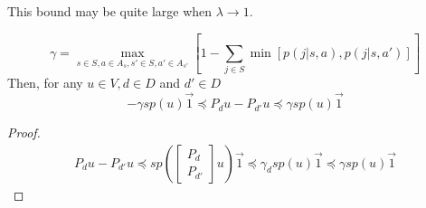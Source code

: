 This bound may be quite large when $ \lambda \rightarrow 1 $.

\begin{lemma}
    \[
        \gamma = \max_{s \in S, a \in A_s, s' \in S, a' \in A_{s'}} \left[ 1 - \sum^{}_{j\in S} \min \left[ p(j|s,a), p(j|s, a') \right]  \right]
    \]
    Then, for any $ u \in V, d \in D $ and $ d' \in D $
    \[
        -\gamma sp(u) \vec{1} \preceq P_d u - P_{d'}u \preceq \gamma sp(u) \vec{1}
    \]
    \begin{proof}
        \begin{align*}
            P_d u - P_{d'}u \preceq sp\left( 
                \begin{bmatrix}
                P_d \\
                P_{d'}
                \end{bmatrix} u \right) \vec{1}
                \preceq \gamma_d sp(u) \vec{1} \preceq \gamma sp(u) \vec{1}
        \end{align*}
    \end{proof}
\end{lemma}

